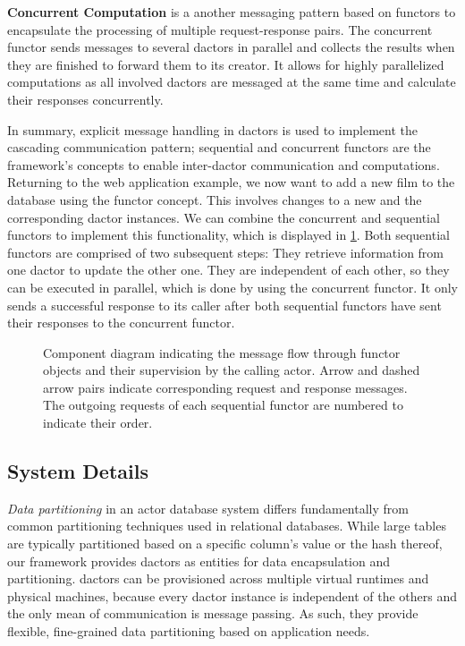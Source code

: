       \textbf{Concurrent Computation} is a another messaging pattern based on \glspl{functor} to encapsulate the processing of multiple request-response pairs.
      The concurrent \gls{functor} sends messages to several \glspl{dactor} in parallel and collects the results when they are finished to forward them to its creator.
      It allows for highly parallelized computations as all involved \glspl{dactor} are messaged at the same time and calculate their responses concurrently.
      
    In summary, explicit message handling in \glspl{dactor} is used to implement the cascading communication pattern; sequential and concurrent \glspl{functor} are the framework's concepts to enable inter-\gls{dactor} communication and computations.
    Returning to the web application example, we now want to add a new film to the database using the \gls{functor} concept.
    This involves changes to a new  and the corresponding  \gls{dactor} instances.
    We can combine the concurrent and sequential \glspl{functor} to implement this functionality, which is displayed in \cref{fig:functor_diagram}.
    Both sequential \glspl{functor} are comprised of two subsequent steps:
    They retrieve information from one \gls{dactor} to update the other one.
    They are independent of each other, so they can be executed in parallel, which is done by using the concurrent \gls{functor}.
    It only sends a successful response to its caller after both sequential \glspl{functor} have sent their responses to the concurrent \gls{functor}.
    
    \begin{figure}
      \centering
      
      \caption{Component diagram indicating the message flow through \gls{functor} objects and their supervision by the calling actor. Arrow and dashed arrow pairs indicate corresponding request and response messages. The outgoing requests of each sequential \gls{functor} are numbered to indicate their order.}
      \label{fig:functor_diagram}
    \end{figure}      
      
    \subsection{System Details}\label{subsec:framework_discussion}
      \emph{Data partitioning} in an actor database system differs fundamentally from common partitioning techniques used in relational databases.
      While large tables are typically partitioned based on a specific column's value or the hash thereof, our framework provides \glspl{dactor} as entities for data encapsulation and partitioning.
      \Glspl{dactor} can be provisioned across multiple virtual runtimes and physical machines, because every \gls{dactor} instance is independent of the others and the only mean of communication is message passing.
      As such, they provide flexible, fine-grained data partitioning based on application needs.
      
